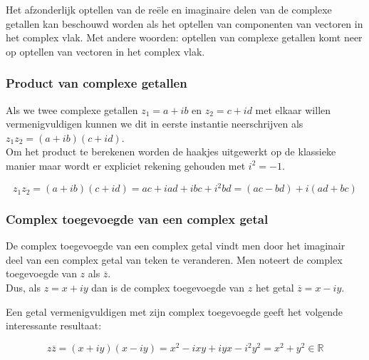 Het afzonderlijk optellen van de re\"{e}le en imaginaire delen van de complexe getallen kan beschouwd worden als het optellen van componenten van vectoren in het complex vlak. Met andere woorden: optellen van complexe getallen komt neer op optellen van vectoren in het complex vlak.\\



\subsubsection{Product van complexe getallen}

Als we twee complexe getallen $z_{1}=a+ib$ en $z_{2}=c+id$ met elkaar willen vermenigvuldigen kunnen we dit in eerste instantie neerschrijven als $z_{1} z_{2}=(a+ib)(c+id)$.\\
Om het product te berekenen worden de haakjes uitgewerkt op de klassieke manier maar wordt er expliciet rekening gehouden met $i^2 =-1$.\\

\begin{eigenschap}
	\begin{framed}
\[ z_{1}z_{2}=(a+ib)(c+id)=ac+iad+ibc+i^2 bd=(ac-bd)+i(ad+bc) \]
\end{framed}
\end{eigenschap}

\subsubsection{Complex toegevoegde van een complex getal}

\begin{definitie}
	De complex toegevoegde van een complex getal vindt men door het imaginair deel van een complex getal van teken te veranderen. Men noteert de complex toegevoegde van $z$ als $\overline{z}$.\\
Dus, als $z=x+iy$ dan is de complex toegevoegde van $z$ het getal $\overline{z}=x-iy$.\\
\end{definitie}
\begin{eigenschap}
	Een getal vermenigvuldigen met zijn complex toegevoegde geeft het volgende interessante resultaat:

\begin{framed}
\[ z \overline{z}=(x+iy)(x-iy)=x^2 -ixy+iyx-i^2 y^2=x^2 +y^2 \in \mathbb{R} \]
\end{framed}
\end{eigenschap}


